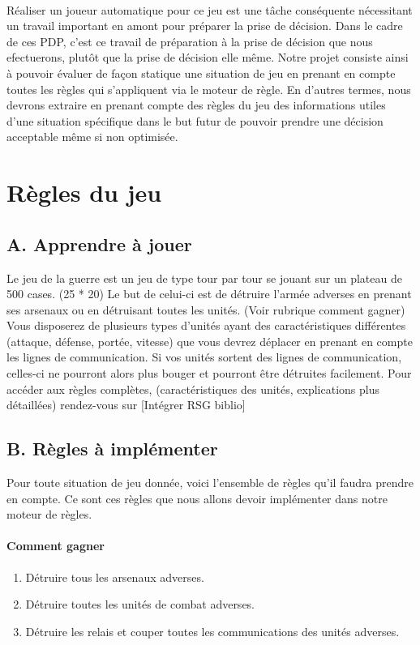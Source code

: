 \documentclass[12pt]{article}
\begin{document}
	\paragraph{}
	Réaliser un joueur automatique pour ce jeu est une tâche conséquente nécessitant un travail important en amont pour préparer la prise de décision.
	Dans le cadre de ces PDP, c'est ce travail de préparation à la prise de décision que nous efectuerons, plutôt que la prise de décision elle même.
	Notre projet consiste ainsi à pouvoir évaluer de façon statique une situation de jeu en prenant en compte toutes les règles qui s'appliquent via le moteur de règle.
	En d'autres termes, nous devrons extraire en prenant compte des règles du jeu des informations utiles d'une situation 
	spécifique dans le but futur de pouvoir prendre une décision acceptable même si non optimisée.
	
	\clearpage
	
	\section{Règles du jeu}    

		\subsection{A. Apprendre à jouer}
		
		Le jeu de la guerre est un jeu de type tour par tour se jouant sur un plateau de 500 cases. (25 * 20)
		Le but de celui-ci est de détruire l'armée adverses en prenant ses arsenaux ou en détruisant toutes les unités. (Voir rubrique comment gagner)
		Vous disposerez de plusieurs types d'unités ayant des caractéristiques différentes (attaque, défense, portée, vitesse) que vous devrez déplacer 
		en prenant en compte les lignes de communication.
		Si vos unités sortent des lignes de communication, celles-ci ne pourront alors plus bouger et pourront être détruites facilement.
		Pour accéder aux règles complètes, (caractéristiques des unités, explications plus détaillées) rendez-vous sur [Intégrer RSG biblio]
		
		\subsection{B. Règles à implémenter}
		Pour toute situation de jeu donnée, voici l'ensemble de règles qu'il faudra prendre en compte.
		Ce sont ces règles que nous allons devoir implémenter dans notre moteur de règles.

		\paragraph{Comment gagner}
		\begin{enumerate}
		\item Détruire tous les arsenaux adverses.
		\item Détruire toutes les unités de combat adverses.
		\item Détruire les relais et couper toutes les communications des unités adverses.
		\end{enumerate}
		
\end{document}
